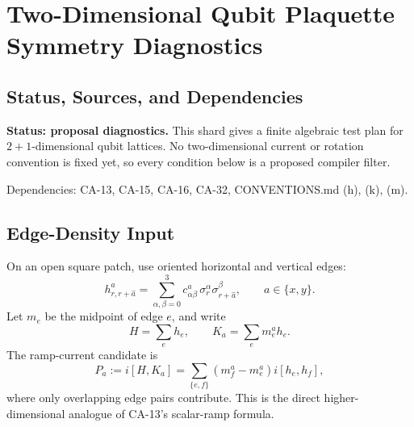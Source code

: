 
\section{Two-Dimensional Qubit Plaquette Symmetry Diagnostics}
\label{sec:qubit-2d-plaquette-symmetry-diagnostics}

\subsection{Status, Sources, and Dependencies}

\textbf{Status: proposal diagnostics.}  This shard gives a finite algebraic
test plan for \(2+1\)-dimensional qubit lattices.  No two-dimensional current
or rotation convention is fixed yet, so every condition below is a proposed
compiler filter.

Dependencies: CA-13, CA-15, CA-16, CA-32, CONVENTIONS.md (h), (k), (m).


\subsection{Edge-Density Input}

On an open square patch, use oriented horizontal and vertical edges:
\[
  h^a_{r,r+\hat a}
  =
  \sum_{\alpha,\beta=0}^3
  c^a_{\alpha\beta}\,
  \sigma_r^\alpha\sigma_{r+\hat a}^\beta,
  \qquad a\in\{x,y\}.
\]
Let \(m_e\) be the midpoint of edge \(e\), and write
\[
  H=\sum_e h_e,\qquad
  K_a=\sum_e m_e^a h_e.
\]
The ramp-current candidate is
\[
  P_a:=i[H,K_a]
  =
  \sum_{\{e,f\}}
  (m_f^a-m_e^a)i[h_e,h_f],
\]
where only overlapping edge pairs contribute.  This is the direct
higher-dimensional analogue of CA-13's scalar-ramp formula.

